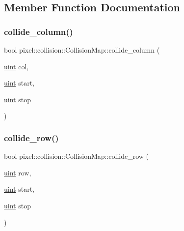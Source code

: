 \subsection{Member Function Documentation}
\mbox{\label{classpixel_1_1collision_1_1_collision_map_a49a0a8ae03166393be6364a874f24de7}} 
\subsubsection{\texorpdfstring{collide\+\_\+column()}{collide\_column()}}
{\footnotesize\ttfamily bool pixel\+::collision\+::\+Collision\+Map\+::collide\+\_\+column (\begin{DoxyParamCaption}\item[{\hyperlink{namespacepixel_a6706355faabffaabebd430b2fa55843a}{uint}}]{col,  }\item[{\hyperlink{namespacepixel_a6706355faabffaabebd430b2fa55843a}{uint}}]{start,  }\item[{\hyperlink{namespacepixel_a6706355faabffaabebd430b2fa55843a}{uint}}]{stop }\end{DoxyParamCaption})}

\mbox{\label{classpixel_1_1collision_1_1_collision_map_af2f5629a4500bba2d172964d740699b1}} 
\subsubsection{\texorpdfstring{collide\+\_\+row()}{collide\_row()}}
{\footnotesize\ttfamily bool pixel\+::collision\+::\+Collision\+Map\+::collide\+\_\+row (\begin{DoxyParamCaption}\item[{\hyperlink{namespacepixel_a6706355faabffaabebd430b2fa55843a}{uint}}]{row,  }\item[{\hyperlink{namespacepixel_a6706355faabffaabebd430b2fa55843a}{uint}}]{start,  }\item[{\hyperlink{namespacepixel_a6706355faabffaabebd430b2fa55843a}{uint}}]{stop }\end{DoxyParamCaption})}

